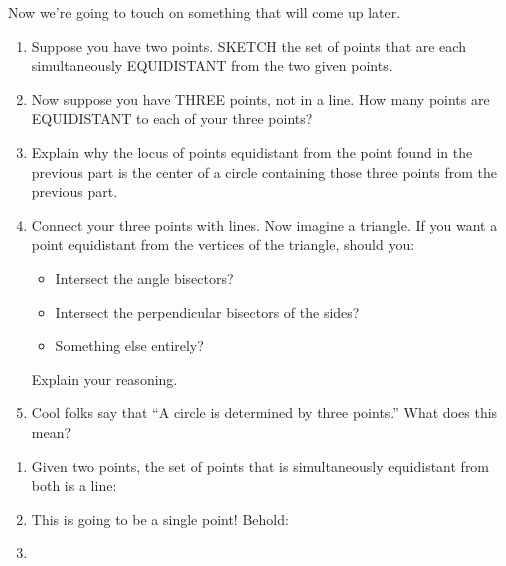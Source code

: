 \documentclass[nooutcomes,noauthor]{ximera}
\begin{document}
\begin{question}
  Now we're going to touch on something that will come up later.
  \begin{enumerate}
  \item Suppose you have two points. SKETCH the set of points that are
    each simultaneously EQUIDISTANT from the two given points.
  \item Now suppose you have THREE points, not in a line. How many
    points are EQUIDISTANT to each of your three points?
  \item Explain why the locus of points equidistant from the point
    found in the previous part is the center of a circle containing
    those three points from the previous part.
  \item Connect your three points with lines. Now imagine a
    triangle. If you want a point equidistant from the vertices of the
    triangle, should you:
    \begin{itemize}
    \item Intersect the angle bisectors?
    \item Intersect the perpendicular bisectors of the sides?
    \item Something else entirely?
    \end{itemize}
    Explain your reasoning.
  \item Cool folks say that ``A circle is determined by three points.'' What does this mean?
  \end{enumerate}
  \begin{freeResponse}
    \begin{enumerate}
    \item Given two points, the set of points that is simultaneously
      equidistant from both is a line:
      \begin{center}
      \end{center}
    \item This is going to be a single point! Behold:
      \begin{center}
      \end{center}
    \item
    \end{enumerate}
  \end{freeResponse}
\end{question}
\end{document}
